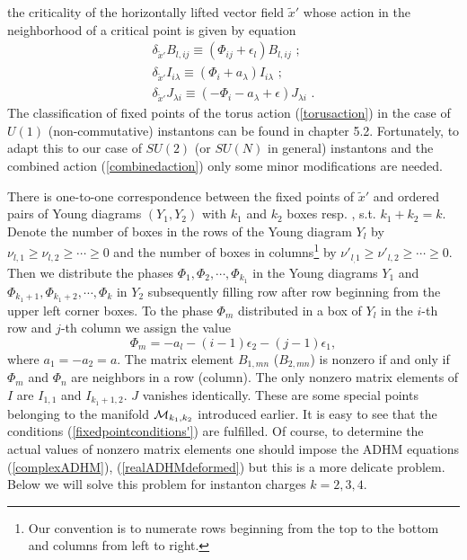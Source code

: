\documentclass[a4paper,12pt]{article}
\begin{document}
the criticality of the horizontally lifted vector field ${\tilde
x}'$ whose action  in the neighborhood  of a critical point is
given by equation
\begin{eqnarray}
\delta_{{\tilde x}'} B_{l,ij}\equiv \left(\Phi_{ij}+\epsilon_l\right)B_{l,ij} \, \, ; \nonumber \\
\delta_{{\tilde x}'} I_{i \lambda}\equiv \left(\Phi_i+a_{\lambda}\right)I_{i\lambda} \, \, ; \nonumber \\
\delta_{{\tilde x}'} J_{\lambda i}\equiv
\left(-\Phi_i-a_{\lambda}+\epsilon \right)J_{\lambda i} \, \, .
\label{xtildeaction}
\end{eqnarray}
The classification of fixed points of the torus action
(\ref{torusaction}) in the case of $U(1)$ (non-commutative)
instantons can be found in \cite{Nak} chapter 5.2. Fortunately, to
adapt this to our case of $SU(2)$ (or $SU(N)$ in general)
instantons and the combined action (\ref{combinedaction}) only
some minor modifications are needed.

There is one-to-one correspondence between the fixed points of
${\tilde x}'$ and ordered pairs of Young diagrams $(Y_1,Y_2)$ with
$k_1$ and $k_2$ boxes resp. , s.t. $k_1+k_2=k$. Denote the number
of boxes in the rows of the Young diagram $Y_l$ by $\nu_{l,1}\geq
\nu_{l,2} \geq \cdots \geq 0 $ and the number of boxes in
columns\footnote{Our convention is to numerate rows beginning from
the top to the bottom and columns from left to right.} by
$\nu'_{l_,1}\geq \nu'_{l,2} \geq \cdots \geq 0 $. Then we
distribute the phases $\Phi_1, \Phi_2, \cdots, \Phi_{k_1}$ in the
Young diagrams $Y_1$ and $\Phi_{k_1+1}, \Phi_{k_1+2}, \cdots,
\Phi_{k}$ in $Y_2$ subsequently filling row after row beginning
from the upper left corner boxes. To the phase $\Phi_m$
distributed in a box of $Y_l$ in the $i$-th row and $j$-th column
we assign the value
\begin{equation}
\Phi_m=-a_l-(i-1)\epsilon_2-(j-1)\epsilon_1, \label{Phivalues}
\end{equation}
where $a_1=-a_2=a$. The matrix element $B_{1,mn}$ ($B_{2,mn}$) is
nonzero if and only if $\Phi_m$ and $\Phi_n$ are neighbors in a
row (column). The only nonzero matrix elements of $I$ are
$I_{1,1}$ and $I_{k_1+1,2}$. $J$ vanishes identically. These are
some special points belonging to the manifold ${\cal M}_{k_1,k_2}$
introduced earlier. It is easy to see that the conditions
(\ref{fixedpointconditions'}) are fulfilled. Of course, to
determine the actual values of nonzero matrix elements one should
impose the ADHM equations (\ref{complexADHM}),
(\ref{realADHMdeformed}) but this is a more delicate problem.
Below we will solve this problem for instanton charges $k=2,3,4$.
\end{document}
